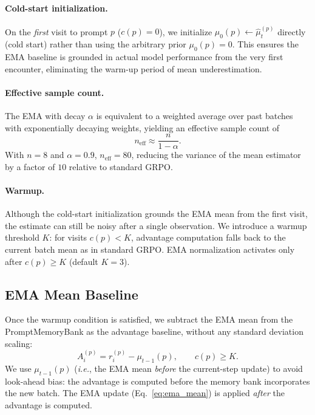 \documentclass[11pt]{article}
\newcommand{\ie}{\textit{i.e.}}
\theoremstyle{definition}
\begin{document}
\paragraph{Cold-start initialization.}
On the \emph{first} visit to prompt $p$ ($c(p)=0$), we initialize
$\mu_0(p) \leftarrow \hat{\mu}_t^{(p)}$ directly (cold start) rather than
using the arbitrary prior $\mu_0(p)=0$.
This ensures the EMA baseline is grounded in actual model performance from
the very first encounter, eliminating the warm-up period of mean underestimation.

\paragraph{Effective sample count.}
The EMA with decay $\alpha$ is equivalent to a weighted average over past
batches with exponentially decaying weights, yielding an effective sample
count of
\begin{equation}
  n_{\mathrm{eff}} \approx \frac{n}{1-\alpha}.
\end{equation}
With $n=8$ and $\alpha=0.9$, $n_{\mathrm{eff}} = 80$, reducing the variance
of the mean estimator by a factor of $10$ relative to standard GRPO.

\paragraph{Warmup.}
Although the cold-start initialization grounds the EMA mean from the first
visit, the estimate can still be noisy after a single observation.
We introduce a warmup threshold $K$: for visits $c(p) < K$, advantage
computation falls back to the current batch mean as in standard GRPO.
EMA normalization activates only after $c(p) \geq K$ (default $K=3$).

\subsection{EMA Mean Baseline}
\label{sec:ema_norm}

Once the warmup condition is satisfied, we subtract the EMA mean from the
PromptMemoryBank as the advantage baseline, without any standard deviation
scaling:
\begin{equation}
  A_i^{(p)} = r_i^{(p)} - \mu_{t-1}(p),
  \qquad c(p) \geq K.
  \label{eq:ema_adv}
\end{equation}
We use $\mu_{t-1}(p)$ (\ie, the EMA mean \emph{before} the current-step
update) to avoid look-ahead bias: the advantage is computed before the memory
bank incorporates the new batch.
The EMA update (Eq.~\eqref{eq:ema_mean}) is applied \emph{after} the
advantage is computed.
\end{document}
